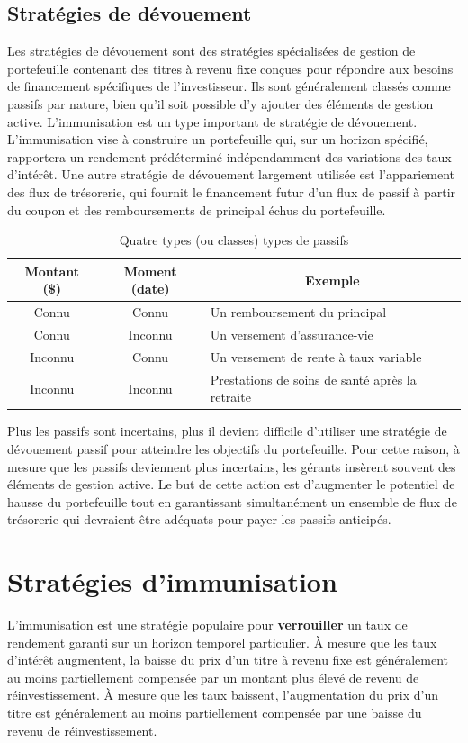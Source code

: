 \documentclass[12pt]{article}
\begin{document}
\subsection{Stratégies de dévouement}
Les stratégies de dévouement sont des stratégies spécialisées de gestion de portefeuille contenant des titres à revenu fixe conçues pour répondre aux besoins de financement spécifiques de l'investisseur. Ils sont généralement classés comme passifs par nature, bien qu'il soit possible d'y ajouter des éléments de gestion active.  L'immunisation est un type important de stratégie de dévouement. L'immunisation vise à construire un portefeuille qui, sur un horizon spécifié, rapportera un rendement prédéterminé indépendamment des variations des taux d'intérêt. Une autre stratégie de dévouement largement utilisée est l'appariement des flux de trésorerie, qui fournit le financement futur d'un flux de passif à partir du coupon et des remboursements de principal échus du portefeuille.

\begin{table}[H]
\caption{Quatre types (ou classes) types de passifs}
\begin{tabular}{@{}ccl@{}}
\toprule
\textbf{Montant (\$)} & \textbf{Moment (date)} & \multicolumn{1}{c}{\textbf{Exemple}}            \\ \midrule
Connu                 & Connu                  & Un remboursement du principal                   \\
Connu                 & Inconnu                & Un versement d'assurance-vie                    \\
Inconnu               & Connu                  & Un versement de rente à taux variable           \\
Inconnu               & Inconnu                & Prestations de soins de santé après la retraite \\ \bottomrule
\end{tabular}
\end{table}
Plus les passifs sont incertains, plus il devient difficile d’utiliser une stratégie de dévouement passif pour atteindre les objectifs du portefeuille. Pour cette raison, à mesure que les passifs deviennent plus incertains, les gérants insèrent souvent des éléments de gestion active. Le but de cette action est d'augmenter le potentiel de hausse du portefeuille tout en garantissant simultanément un ensemble de flux de trésorerie qui devraient être adéquats pour payer les passifs anticipés.

\section{Stratégies d'immunisation}
L'immunisation est une stratégie populaire pour \textbf{verrouiller} un taux de rendement garanti sur un horizon temporel particulier. À mesure que les taux d'intérêt augmentent, la baisse du prix d'un titre à revenu fixe est généralement au moins partiellement compensée par un montant plus élevé de revenu de réinvestissement. À mesure que les taux baissent, l’augmentation du prix d’un titre est généralement au moins partiellement compensée par une baisse du revenu de réinvestissement.
\end{document}
